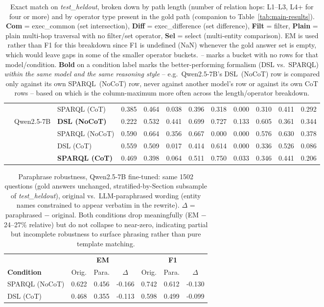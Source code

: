 \begin{table}[t]
\begin{tabular}{c l l ccccccccc}
 &  & SPARQL (CoT) & 0.385 & 0.464 & 0.038 & 0.396 & 0.318 & 0.000 & 0.310 & 0.411 & 0.292 \\
\cmidrule(lr){2-12}
 & \multirow{4}{*}{Qwen2.5-7B} & \textbf{DSL (NoCoT)} & 0.222 & 0.532 & 0.441 & 0.699 & 0.727 & 0.133 & 0.605 & 0.361 & 0.344 \\
 &  & SPARQL (NoCoT) & 0.590 & 0.664 & 0.356 & 0.667 & 0.000 & 0.000 & 0.576 & 0.630 & 0.378 \\
\cmidrule(l){3-12}
 &  & DSL (CoT) & 0.559 & 0.509 & 0.017 & 0.414 & 0.614 & 0.000 & 0.336 & 0.526 & 0.086 \\
 &  & \textbf{SPARQL (CoT)} & 0.469 & 0.398 & 0.064 & 0.511 & 0.750 & 0.033 & 0.346 & 0.441 & 0.206 \\
\bottomrule
\end{tabular}
\caption{Exact match on \emph{test\_heldout}, broken down by path length (number of relation hops: L1--L3, L4+ for four or more) and by operator type present in the gold path (companion to Table~\ref{tab:main-results}). \textbf{Com} = exec\_common (set intersection), \textbf{Diff} = exec\_difference (set difference), \textbf{Filt} = filter, \textbf{Plain} = plain multi-hop traversal with no filter/set operator, \textbf{Sel} = select (multi-entity comparison). EM is used rather than F1 for this breakdown since F1 is undefined (NaN) whenever the gold answer set is empty, which would leave gaps in some of the smaller operator buckets. \emph{--} marks a bucket with no rows for that model/condition. \textbf{Bold} on a condition label marks the better-performing formalism (DSL vs.\ SPARQL) \emph{within the same model and the same reasoning style} -- e.g.\ Qwen2.5-7B's DSL~(NoCoT) row is compared only against its own SPARQL~(NoCoT) row, never against another model's row or against its own CoT rows -- based on which is the column-maximum more often across the length/operator breakdown.}
\label{tab:by-length-operator}
\end{table}

\begin{table}[t]
\centering
\small
\begin{tabular}{l ccc ccc}
\toprule
 & \multicolumn{3}{c}{\textbf{EM}} & \multicolumn{3}{c}{\textbf{F1}} \\
\cmidrule(lr){2-4} \cmidrule(lr){5-7}
\textbf{Condition} & Orig. & Para. & $\Delta$ & Orig. & Para. & $\Delta$ \\
\midrule
SPARQL (NoCoT) & 0.622 & 0.456 & -0.166 & 0.742 & 0.612 & -0.130 \\
DSL (CoT) & 0.468 & 0.355 & -0.113 & 0.598 & 0.499 & -0.099 \\
\bottomrule
\end{tabular}
\caption{Paraphrase robustness, Qwen2.5-7B fine-tuned: same 1502 questions (gold answers unchanged, stratified-by-Section subsample of \emph{test\_heldout}), original vs.\ LLM-paraphrased wording (entity names constrained to appear verbatim in the rewrite). $\Delta$ = paraphrased $-$ original. Both conditions drop meaningfully (EM $-$24--27\% relative) but do not collapse to near-zero, indicating partial but incomplete robustness to surface phrasing rather than pure template matching.}
\label{tab:paraphrase-robustness}
\end{table}
